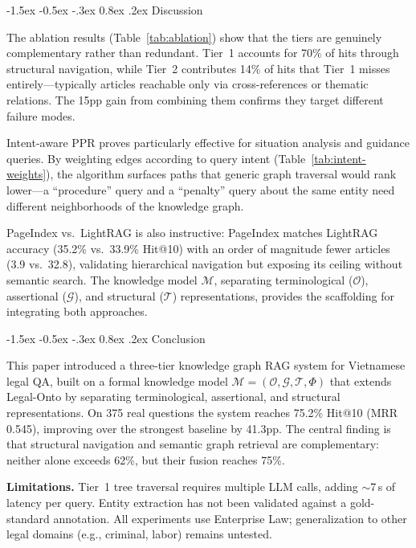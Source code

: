 \documentclass{IOS-Book-Article}
\makeatletter
\renewcommand\section{\@startsection{section}{1}{\z@}%
  {-1.5ex \@plus -0.5ex \@minus -.3ex}%
  {0.8ex \@plus .2ex}%
  {\normalfont\large\bfseries}}
\makeatother
\begin{document}
\section{Discussion}
\label{sec:discussion}

The ablation results (Table~\ref{tab:ablation}) show that the tiers are genuinely complementary rather than redundant. Tier~1 accounts for 70\% of hits through structural navigation, while Tier~2 contributes 14\% of hits that Tier~1 misses entirely---typically articles reachable only via cross-references or thematic relations. The 15pp gain from combining them confirms they target different failure modes.

Intent-aware PPR proves particularly effective for situation analysis and guidance queries. By weighting edges according to query intent (Table~\ref{tab:intent-weights}), the algorithm surfaces paths that generic graph traversal would rank lower---a ``procedure'' query and a ``penalty'' query about the same entity need different neighborhoods of the knowledge graph.

PageIndex vs.\ LightRAG is also instructive: PageIndex matches LightRAG accuracy (35.2\% vs.\ 33.9\% Hit@10) with an order of magnitude fewer articles (3.9 vs.\ 32.8), validating hierarchical navigation but exposing its ceiling without semantic search. The knowledge model $\mathcal{M}$, separating terminological ($\mathcal{O}$), assertional ($\mathcal{G}$), and structural ($\mathcal{T}$) representations, provides the scaffolding for integrating both approaches.

\section{Conclusion}
\label{sec:conclusion}

This paper introduced a three-tier knowledge graph RAG system for Vietnamese legal QA, built on a formal knowledge model $\mathcal{M} = (\mathcal{O}, \mathcal{G}, \mathcal{T}, \Phi)$ that extends Legal-Onto by separating terminological, assertional, and structural representations. On 375 real questions the system reaches 75.2\% Hit@10 (MRR 0.545), improving over the strongest baseline by 41.3pp. The central finding is that structural navigation and semantic graph retrieval are complementary: neither alone exceeds 62\%, but their fusion reaches 75\%.

\textbf{Limitations.} Tier~1 tree traversal requires multiple LLM calls, adding $\sim$7\,s of latency per query. Entity extraction has not been validated against a gold-standard annotation. All experiments use Enterprise Law; generalization to other legal domains (e.g., criminal, labor) remains untested.
\end{document}
